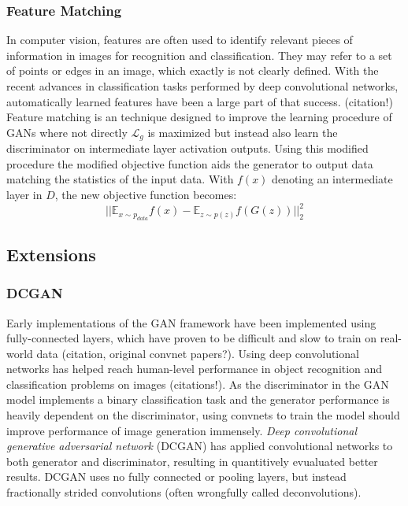 \subsubsection{Feature Matching}
\label{ssub:gan_feature_matching}
In computer vision, features are often used to identify relevant pieces of information in images for recognition and classification.
They may refer to a set of points or edges in an image, which exactly is not clearly defined.
With the recent advances in classification tasks performed by deep convolutional networks, automatically learned features have been a large part of that success. (citation!)
Feature matching is an technique designed to improve the learning procedure of GANs where not directly $\mathcal{L}_g$ is maximized but instead also learn the discriminator on intermediate layer activation outputs.
Using this modified procedure the modified objective function aids the generator to output data matching the statistics of the input data.
With $f(x)$ denoting an intermediate layer in $D$, the new objective function becomes:
$$
|| \mathbb{E}_{x \sim p_{data}}f(x) - \mathbb{E}_{z \sim p(z)}f(G(z)) || ^{2}_{2}
$$






\subsection{Extensions}
\label{sub:gan_extensions}

\subsubsection{DCGAN \cite{dcgan:2015}}
\label{ssub:dcgan}
Early implementations of the GAN framework have been implemented using fully-connected layers,
which have proven to be difficult and slow to train on real-world data (citation, original convnet papers?).
Using deep convolutional networks has helped reach human-level performance in object recognition and classification problems on images (citations!).
As the discriminator in the GAN model implements a binary classification task and the generator performance is heavily dependent on the discriminator, using convnets to train the model should improve performance of image generation immensely.
\emph{Deep convolutional generative adversarial network} (DCGAN) has applied convolutional networks to both generator and discriminator, resulting in quantitively evualuated better results.
DCGAN uses no fully connected or pooling layers, but instead fractionally strided convolutions (often wrongfully called deconvolutions).

